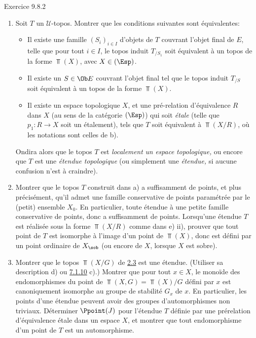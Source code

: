 \begin{enonce*}[remark]{Exercice 9.8.2}
\begin{enumerate}
\item Soit $T$ un $𝒰$-topos. Montrer que les conditions suivantes
sont équivalentes:
\begin{itemize}
\item[(i)] Il existe une famille $(S_i)_{i\in I}$ d'objets de $T$
couvrant l'objet final de $E$, telle que pour tout $i\in I$, le
topos induit $T_{/S_1}$ soit équivalent à un topos de la forme
$\Top(X)$, avec $X\in(\Esp)$.

\item[${\rm (i')}$] Il existe un $S\in \Ob E$ couvrant l'objet final
tel que le topos induit $T_{/S}$ soit équivalent à un topos de la
forme $\Top(X)$.

\item[(ii)] Il existe un espace topologique $X$, et une pré-relation
d'équivalence $R$ dans $X$ (au sens de la catégorie $(\Esp)$) qui
soit \emph{étale} (\ie telle que $p_1:R\rightarrow X$ soit un
étalement), tels que $T$ soit équivalent à $\Top(X/R)$, où les
notations sont celles de b).
\end{itemize}

On\pageoriginale dira alors que le topos $T$ est \emph{localement un
espace topologique,} ou encore que $T$ est une \emph{étendue
topologique} (ou simplement une \emph{étendue,} si aucune confusion
n'est à craindre).

\item Montrer que le topos $T$ construit dans a) a suffisamment de
points, et plus précisément, qu'il admet une famille conservative de
points paramétrée par le (petit) ensemble $X_0$. En particulier,
toute étendue à une petite famille conservative de points, donc a
suffisamment de points. Lorsqu'une étendue $T$ est réalisée sous la
forme $\Top(X/R)$ comme dans e) ii), prouver que tout point de $T$
est isomorphe à l'image d'un point de $\Top(X)$, donc est défini par
un point ordinaire de $X_{\sob}$ (ou encore de $X$, lorsque $X$ est
sobre).

\item Montrer que le topos $\Top(X/G)$ de \hyperref[IV.subsec2.3]{2.3} est une
étendue. (Utiliser sa description d) ou \hyperref[IV.exer7.1.10]{7.1.10} c).)
Montrer que pour tout $x\in X$, le monoïde des endomorphismes du
point de $\Top(X,G)=\Top(X)/G$ défini par $x$ est canoniquement
isomorphe au groupe de stabilité $G_x$ de $x$. En particulier, les
points d'une étendue peuvent avoir des groupes d'automorphismes non
triviaux. Déterminer $\Ppoint(J)$ pour l'étendue $T$ définie par une
prérelation d'équivalence étale dans un espace $X$, et montrer que
tout endomorphisme d'un point de $T$ est un automorphisme.


\end{enumerate}
\end{enonce*}
